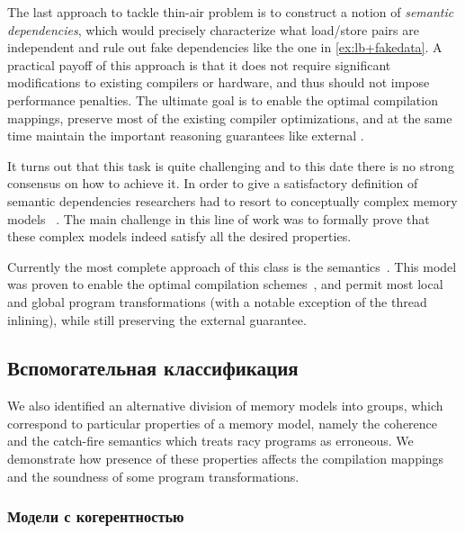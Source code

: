 The last approach to tackle thin-air problem is to   
construct a notion of \emph{semantic dependencies}, 
which would precisely characterize what load/store 
pairs are independent and rule out fake dependencies 
like the one in \ref{ex:lb+fakedata}.
A practical payoff of this approach is that it 
does not require significant modifications to existing compilers or hardware, 
and thus should not impose performance penalties.  
The ultimate goal is to enable the optimal compilation mappings, 
preserve most of the existing compiler optimizations, 
and at the same time maintain the important 
reasoning guarantees like external \DRF. 

It turns out that this task is quite challenging 
and to this date there is no strong consensus on how to achieve it.
In order to give a satisfactory definition of semantic dependencies 
researchers had to resort to conceptually complex memory models%
~\cite{Jagadeesan-al:ESOP10, Kang-al:POPL17, Jeffrey-Riely:LICS16, 
PichonPharabod-Sewell:POPL16, Chakraborty-Vafeiadis:POPL19, Paviotti-al:ESOP20}.
The main challenge in this line of work was to formally prove 
that these complex models indeed satisfy all the desired properties. 

Currently the most complete approach of this class 
is the \Promising semantics~\cite{Kang-al:POPL17, Lee-al:PLDI20}. 
This model was proven to enable the optimal compilation schemes~\cite{Podkopaev-al:POPL19}, 
and permit most local and global program transformations
(with a notable exception of the thread inlining), 
while still preserving the external \DRF guarantee.

\subsection{Вспомогательная классификация}
\label{sec:analysis:other}

We also identified an alternative division of memory models into groups, 
which correspond to particular properties of a memory model, 
namely the coherence and the catch-fire semantics which treats racy programs 
as erroneous. We demonstrate how presence of these properties 
affects the compilation mappings and the soundness of some program transformations.

\subsubsection{Модели с когерентностью}
\label{sec:analysis:coh}

